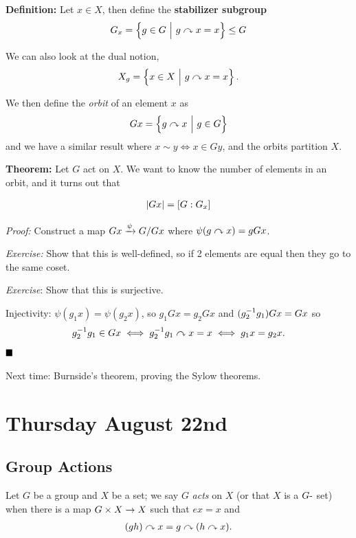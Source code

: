 \textbf{Definition:} Let \(x\in X\), then define the \textbf{stabilizer
subgroup}
\begin{align*}
G_{x} = \left\{{g\in G {~\mathrel{\Big|}~} g\curvearrowright x = x}\right\} \leq G
\end{align*}

We can also look at the dual notion,
\begin{align*}
X_{g} = \left\{{x\in X {~\mathrel{\Big|}~} g\curvearrowright x = x}\right\}.
\end{align*}

We then define the \emph{orbit} of an element \(x\) as
\begin{align*}
Gx = \left\{{g\curvearrowright x {~\mathrel{\Big|}~} g\in G}\right\}
\end{align*} and we have a similar result where
\(x\sim y \iff x\in Gy\), and the orbits partition \(X\).

\textbf{Theorem:} Let \(G\) act on \(X\). We want to know the number of
elements in an orbit, and it turns out that

\begin{align*}
{\left\lvert {Gx} \right\rvert} = [G: G_{x}]
\end{align*}

\emph{Proof:} Construct a map \(Gx \xrightarrow{\psi} G/Gx\) where
\(\psi(g\curvearrowright x) = g Gx\).

\emph{Exercise:} Show that this is well-defined, so if 2 elements are
equal then they go to the same coset.

\emph{Exercise}: Show that this is surjective.

Injectivity: \(\psi(g_{1} x) = \psi(g_{2} x)\), so
\(g_{1} Gx = g_{2} Gx\) and \((g_{2}^{-1} g_{1}) Gx = Gx\) so
\begin{align*}
g_{2}^{-1} g_{1} \in Gx \iff g_{2}^{-1} g_{1} \curvearrowright x = x \iff g_{1}x = g_{2} x
.\end{align*} \(\qed\)

Next time: Burnside's theorem, proving the Sylow theorems.

\hypertarget{thursday-august-22nd}{%
\section{Thursday August 22nd}\label{thursday-august-22nd}}

\hypertarget{group-actions}{%
\subsection{Group Actions}\label{group-actions}}

Let \(G\) be a group and \(X\) be a set; we say \(G\) \emph{acts} on
\(X\) (or that \(X\) is a \(G{\hbox{-}}\) set) when there is a map
\(G\times X \to X\) such that \(ex = x\) and
\begin{align*}
(gh) \curvearrowright x = g \curvearrowright (h \curvearrowright x)
.\end{align*}

